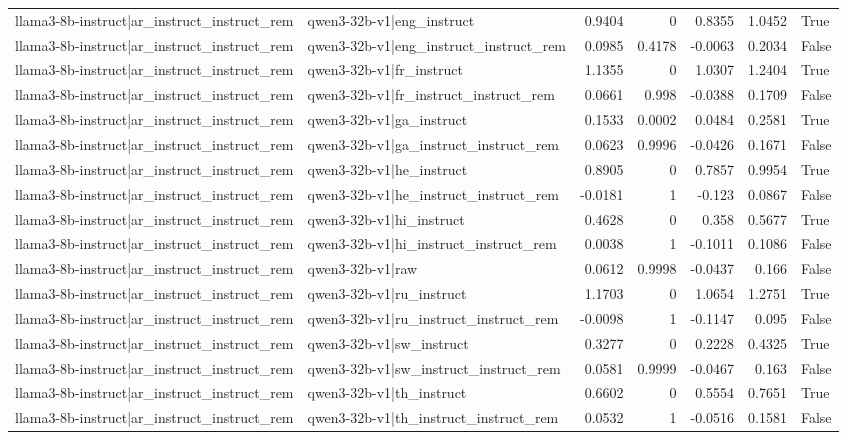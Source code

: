 \begin{table}
\begin{tabular}{l l r r r r l}
llama3-8b-instruct|ar_instruct_instruct_rem & qwen3-32b-v1|eng_instruct & 0.9404 & 0 & 0.8355 & 1.0452 & True \\
llama3-8b-instruct|ar_instruct_instruct_rem & qwen3-32b-v1|eng_instruct_instruct_rem & 0.0985 & 0.4178 & -0.0063 & 0.2034 & False \\
llama3-8b-instruct|ar_instruct_instruct_rem & qwen3-32b-v1|fr_instruct & 1.1355 & 0 & 1.0307 & 1.2404 & True \\
llama3-8b-instruct|ar_instruct_instruct_rem & qwen3-32b-v1|fr_instruct_instruct_rem & 0.0661 & 0.998 & -0.0388 & 0.1709 & False \\
llama3-8b-instruct|ar_instruct_instruct_rem & qwen3-32b-v1|ga_instruct & 0.1533 & 0.0002 & 0.0484 & 0.2581 & True \\
llama3-8b-instruct|ar_instruct_instruct_rem & qwen3-32b-v1|ga_instruct_instruct_rem & 0.0623 & 0.9996 & -0.0426 & 0.1671 & False \\
llama3-8b-instruct|ar_instruct_instruct_rem & qwen3-32b-v1|he_instruct & 0.8905 & 0 & 0.7857 & 0.9954 & True \\
llama3-8b-instruct|ar_instruct_instruct_rem & qwen3-32b-v1|he_instruct_instruct_rem & -0.0181 & 1 & -0.123 & 0.0867 & False \\
llama3-8b-instruct|ar_instruct_instruct_rem & qwen3-32b-v1|hi_instruct & 0.4628 & 0 & 0.358 & 0.5677 & True \\
llama3-8b-instruct|ar_instruct_instruct_rem & qwen3-32b-v1|hi_instruct_instruct_rem & 0.0038 & 1 & -0.1011 & 0.1086 & False \\
llama3-8b-instruct|ar_instruct_instruct_rem & qwen3-32b-v1|raw & 0.0612 & 0.9998 & -0.0437 & 0.166 & False \\
llama3-8b-instruct|ar_instruct_instruct_rem & qwen3-32b-v1|ru_instruct & 1.1703 & 0 & 1.0654 & 1.2751 & True \\
llama3-8b-instruct|ar_instruct_instruct_rem & qwen3-32b-v1|ru_instruct_instruct_rem & -0.0098 & 1 & -0.1147 & 0.095 & False \\
llama3-8b-instruct|ar_instruct_instruct_rem & qwen3-32b-v1|sw_instruct & 0.3277 & 0 & 0.2228 & 0.4325 & True \\
llama3-8b-instruct|ar_instruct_instruct_rem & qwen3-32b-v1|sw_instruct_instruct_rem & 0.0581 & 0.9999 & -0.0467 & 0.163 & False \\
llama3-8b-instruct|ar_instruct_instruct_rem & qwen3-32b-v1|th_instruct & 0.6602 & 0 & 0.5554 & 0.7651 & True \\
llama3-8b-instruct|ar_instruct_instruct_rem & qwen3-32b-v1|th_instruct_instruct_rem & 0.0532 & 1 & -0.0516 & 0.1581 & False \\

\end{tabular}
\end{table}
